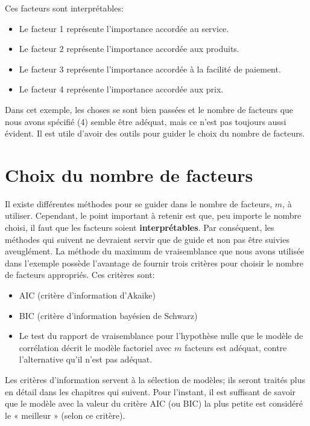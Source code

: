 \documentclass[
  11pt,
  letterpaper,
]{book}
\providecommand{\tightlist}{%
  \setlength{\itemsep}{0pt}\setlength{\parskip}{0pt}}
\theoremstyle{definition}
\theoremstyle{definition}
\theoremstyle{definition}
\theoremstyle{definition}
\theoremstyle{remark}
\begin{document}
Ces facteurs sont interprétables:

\begin{itemize}
\tightlist
\item
  Le facteur 1 représente l'importance accordée au service.
\item
  Le facteur 2 représente l'importance accordée aux produits.
\item
  Le facteur 3 représente l'importance accordée à la facilité de paiement.
\item
  Le facteur 4 représente l'importance accordée aux prix.
\end{itemize}

Dans cet exemple, les choses se sont bien passées et le nombre de facteurs que nous avons spécifié (4) semble être adéquat, mais ce n'est pas toujours aussi évident. Il est utile d'avoir des outils pour guider le choix du nombre de facteurs.

\hypertarget{choix-du-nombre-de-facteurs}{%
\section{Choix du nombre de facteurs}\label{choix-du-nombre-de-facteurs}}

Il existe différentes méthodes pour se guider dans le nombre de facteurs, \(m\), à utiliser. Cependant, le point important à retenir est que, peu importe le nombre choisi, il faut que les facteurs soient \textbf{interprétables}. Par conséquent, les méthodes qui
suivent ne devraient servir que de guide et non pas être suivies aveuglément.
La méthode du maximum de vraisemblance que nous avons utilisée dans l'exemple possède l'avantage de fournir trois critères pour choisir le nombre de facteurs appropriés. Ces critères sont:

\begin{itemize}
\tightlist
\item
  AIC (critère d'information d'Akaike)
\item
  BIC (critère d'information bayésien de Schwarz)
\item
  Le test du rapport de vraisemblance pour l'hypothèse nulle que le modèle de corrélation décrit le modèle factoriel avec \(m\) facteurs est adéquat, contre l'alternative qu'il n'est pas adéquat.
\end{itemize}

Les critères d'information servent à la sélection de modèles; ils seront traités plus en détail dans les chapitres qui suivent. Pour l'instant, il est suffisant de savoir que le modèle avec la valeur du critère AIC (ou BIC) la plus petite est considéré le « meilleur » (selon ce critère).
\end{document}
